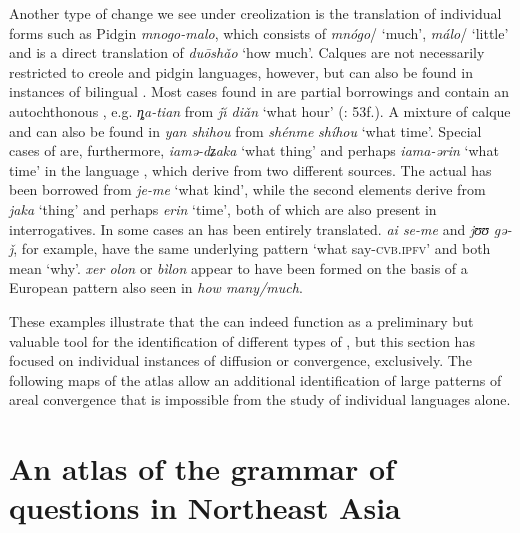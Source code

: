 Another type of change we see under creolization is the translation of individual forms such as  Pidgin  \textit{mnogo-malo}, which consists of  \textit{mnógo}/ ‘much’, \textit{málo}/ ‘little’ and is a direct translation of  \textit{du\=o}\textit{shǎo}  ‘how much’. Calques are not necessarily restricted to creole and pidgin languages, however, but can also be found in instances of bilingual . Most cases found in  are partial borrowings and contain an autochthonous , e.g.  \textit{ȵa-tian} from  \textit{j\u{\i} diǎn}  ‘what hour’ (\citealt{LaPollaHuang2003}: 53f.). A mixture of calque and  can also be found in  \textit{yan shihou} from  \textit{shénme} \textit{shíhou} ‘what time’. Special cases of  are, furthermore, \textit{iamə-dʑaka} ‘what thing’ and perhaps \textit{iama-ərin} ‘what time’ in the  language , which derive from two different sources. The actual  has been borrowed from  \textit{je-me} ‘what kind’, while the second elements derive from  \textit{jaka} ‘thing’ and perhaps \textit{erin} ‘time’, both of which are also present in  interrogatives. In some cases an  has been entirely translated.  \textit{ai se-me} and   \textit{jʊʊ gə-ǰ}, for example, have the same underlying pattern ‘what say-\textsc{cvb.ipfv}’ and both mean ‘why’.  \textit{xer olon} or  \textit{bìlon} appear to have been formed on the basis of a European pattern also seen in  \textit{how many/much}.

These examples illustrate that the  can indeed function as a preliminary but valuable tool for the identification of different types of , but this section has focused on individual instances of diffusion or convergence, exclusively. The following maps of the atlas allow an additional identification of large patterns of areal convergence that is impossible from the study of individual languages alone.


\section{An atlas of the grammar of questions in Northeast Asia}\label{sec:6.4}

